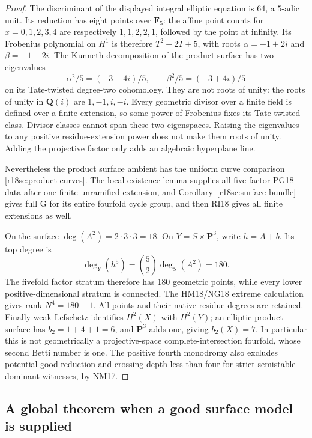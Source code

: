 \begin{proof}
The discriminant of the displayed integral
elliptic equation is $64$, a $5$-adic unit.
Its reduction has eight points over
$\mathbf F_5$: the affine point counts
for $x=0,1,2,3,4$ are respectively
$1,1,2,2,1$, followed by the point
at infinity.  Its Frobenius polynomial
on $H^1$ is therefore $T^2+2T+5$,
with roots $\alpha=-1+2i$ and
$\beta=-1-2i$.
The Kunneth decomposition of the product
surface has two eigenvalues
\[
                    \alpha^2/5=(-3-4i)/5,
                    \qquad\beta^2/5=(-3+4i)/5
\]
on its Tate-twisted degree-two cohomology.
They are not roots of unity: the roots
of unity in $\mathbf Q(i)$ are
$1,-1,i,-i$.  Every geometric divisor
over a finite field is defined over a
finite extension, so some power of
Frobenius fixes its Tate-twisted class.
Divisor classes cannot span these two
eigenspaces.  Raising the eigenvalues
to any positive residue-extension power
does not make them roots of unity.
Adding the projective factor only adds
an algebraic hyperplane line.

Nevertheless the product surface ambient
has the uniform curve comparison
\eqref{r18sc:product-curves}.
The local existence lemma supplies all
five-factor PG18 data after one finite
unramified extension, and
Corollary~\ref{r18sc:surface-bundle}
gives full G for its entire fourfold
cycle group, and then RI18 gives all
finite extensions as well.

On the surface $\deg(A^2)=2\cdot3\cdot3=18$.
On $Y=S\times\mathbf P^3$, write
$h=A+b$.  Its top degree is
\[
                        \deg_Y(h^5)=\binom52\deg_S(A^2)=180.
\]
The fivefold factor stratum therefore
has 180 geometric points, while every
lower positive-dimensional stratum is
connected.  The HM18/NG18 extreme
calculation gives rank $N^4=180-1$.
All points and their native residue
degrees are retained.
Finally weak Lefschetz identifies
$H^2(X)$ with $H^2(Y)$; an elliptic
product surface has $b_2=1+4+1=6$,
and $\mathbf P^3$ adds one, giving
$b_2(X)=7$.  In particular this is
not geometrically a projective-space
complete-intersection fourfold, whose
second Betti number is one.
The positive fourth monodromy also
excludes potential good reduction
and crossing depth less than four
for strict semistable dominant
witnesses, by NM17.
\end{proof}

\subsection{A global theorem when a good surface model is supplied}

